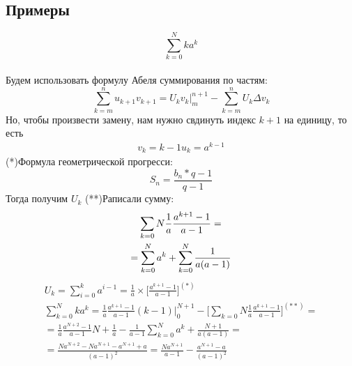 \documentclass[a4paper,11pt]{article}
\begin{document}
  \subsection{Примеры}
    \[\sum_{k=0}^N ka^k\] \\
    Будем использовать формулу Абеля суммирования по частям: \\
    \[\sum_{k=m}^{n} u_{k+1} v_{k+1} = U_k v_k \bigg|_{m}^{n+1} - \sum_{k=m}^{n} U_k \Delta v_k\]
    Но, чтобы произвести замену, нам нужно свдинуть индекс $k+1$ на единицу, то есть \\
    \begin{equation*}
      \begin{split}
      v_k = k - 1
      u_k = a^{k-1}
      \end{split}
    \end{equation*}
    \marginpar
    {
      \footnotesize (*)Формула геометрической прогресси:
      \footnotesize \[S_n = \frac{b_n*q-1}{q-1}\]
    }
    Тогда получим $U_k$
    \marginpar
    {
      \footnotesize (**)Раписали сумму:
      \begin{gather*}
        \footnotesize \sum_{k=0}{N} \frac{1}{a} \frac{a^{k+1}-1}{a-1} = \\
        = \sum_{k=0}^{N}a^k + \sum_{k=0}^{N}\frac{1}{a(a-1)}
      \end{gather*}
    }
    \begin{equation*}
      \begin{split}
        U_k = \sum_{i=0}^{k}a^{i-1} = \frac{1}{a} \times \bigg[ \frac{a^{k+1}-1}{a-1} \bigg]^{(*)} \\
        \sum_{k=0}^{N}ka^k = \frac{1}{a} \frac{a^{k+1}-1}{a-1}(k-1) \bigg|_{0}^{N+1} - \bigg[\sum_{k=0}{N} \frac{1}{a} \frac{a^{k+1}-1}{a-1} \bigg]^{(**)} = \\
        = \frac{1}{a} \frac{a^{N+2}-1}{a-1}N + \frac{1}{a} - \frac{1}{a-1} \sum_{k=0}^{N}a^k + \frac{N+1}{a(a-1)} = \\
        = \frac{Na^{N+2} - Na^{N+1} - a^{N+1} + a}{(a-1)^2}
        = \frac{Na^{N+1}}{a-1} - \frac{a^{N+1} - a}{(a-1)^2}
      \end{split}
    \end{equation*}
\newpage
\end{document}
